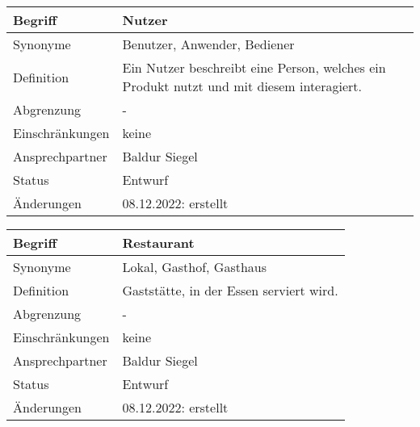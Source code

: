 \begin{table}[H]
    \centering
    \label{gls:nutzer}
    \begin{tabularx}{\textwidth}{| l | X |}
        \hline
        Begriff         & Nutzer                                                                                   \\
        \hline
        Synonyme        & Benutzer, Anwender, Bediener                                                             \\
        \hline
        Definition      & Ein Nutzer beschreibt eine Person, welches ein Produkt nutzt und mit diesem interagiert. \\
        \hline
        Abgrenzung      & -                                                                                        \\
        \hline
        Einschränkungen & keine                                                                                    \\
        \hline
        Ansprechpartner & Baldur Siegel                                                                            \\
        \hline
        Status          & Entwurf                                                                                  \\
        \hline
        Änderungen      & 08.12.2022: erstellt                                                                     \\
        \hline
    \end{tabularx}
\end{table}



\begin{table}[H]
    \centering
    \label{gls:restaurant}
    \begin{tabularx}{\textwidth}{| l | X |}
        \hline
        Begriff         & Restaurant                              \\
        \hline
        Synonyme        & Lokal, Gasthof, Gasthaus                \\
        \hline
        Definition      & Gaststätte, in der Essen serviert wird. \\
        \hline
        Abgrenzung      & -                                       \\
        \hline
        Einschränkungen & keine                                   \\
        \hline
        Ansprechpartner & Baldur Siegel                           \\
        \hline
        Status          & Entwurf                                 \\
        \hline
        Änderungen      & 08.12.2022: erstellt                    \\
        \hline
    \end{tabularx}
\end{table}

